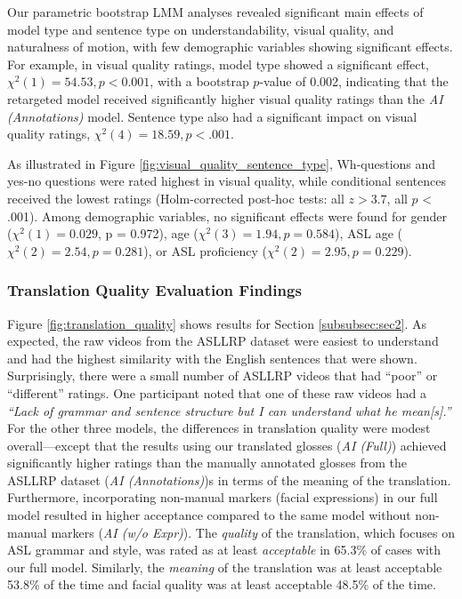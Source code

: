 Our parametric bootstrap LMM analyses revealed significant main effects of model type and sentence type on understandability, visual quality, and naturalness of motion, with few demographic variables showing significant effects. For example, in visual quality ratings, model type showed a significant effect, $\chi^2(1)=54.53, p<0.001$, with a bootstrap $p$-value of 0.002, indicating that the retargeted model received significantly higher visual quality ratings than the \textit{AI (Annotations)} model. Sentence type also had a significant impact on visual quality ratings, $\chi^2(4) = 18.59, p < .001$. 

As illustrated in Figure \ref{fig:visual_quality_sentence_type}, Wh-questions and yes-no questions were rated highest in visual quality, while conditional sentences received the lowest ratings (Holm-corrected post-hoc tests: all $z > 3.7$, all $p$ < .001). Among demographic variables, no significant effects were found for gender ($\chi^2(1) = 0.029$, p = 0.972), age ($\chi^2(3) = 1.94, p = 0.584$), ASL age ($\chi^2(2) = 2.54, p = 0.281$), or ASL proficiency ($\chi^2(2) = 2.95, p = 0.229$). 

\subsubsection{Translation Quality Evaluation Findings} Figure \ref{fig:translation_quality} shows results for Section \ref{subsubsec:sec2}. As expected, the raw videos from the ASLLRP dataset were easiest to understand and had the highest similarity with the English sentences that were shown. Surprisingly, there were a small number of ASLLRP videos that had ``poor'' or ``different'' ratings. One participant noted that one of these raw videos had a \textit{``Lack of grammar and sentence structure but I can understand what he mean[s].''} For the other three models, the differences in translation quality were modest overall---except that the results using our translated glosses (\textit{AI (Full)}) achieved significantly higher ratings than the manually annotated glosses from the ASLLRP dataset (\textit{AI (Annotations)})s in terms of the meaning of the translation. Furthermore, incorporating non-manual markers (\ie facial expressions) in our full model resulted in higher acceptance compared to the same model without non-manual markers (\textit{AI (w/o Expr)}). The \textit{quality} of the translation, which focuses on ASL grammar and style, was rated as at least \textit{acceptable} in 65.3\% of cases with our full model. Similarly, the \textit{meaning} of the translation was at least acceptable 53.8\% of the time and facial quality was at least acceptable 48.5\% of the time.

